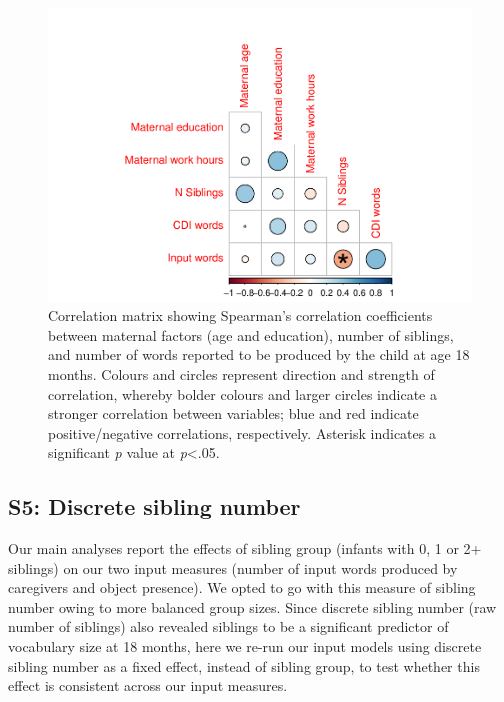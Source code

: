 \documentclass[
  man,mask,floatsintext]{apa6}
\begin{document}
\begin{figure}
\centering
\includegraphics{SiblingsStudy_SupplementaryData-anon-revisions_files/figure-latex/Figure-correlations-1.pdf}
\caption{\label{fig:Figure-correlations}Correlation matrix showing Spearman's correlation coefficients between maternal factors (age and education), number of siblings, and number of words reported to be produced by the child at age 18 months. Colours and circles represent direction and strength of correlation, whereby bolder colours and larger circles indicate a stronger correlation between variables; blue and red indicate positive/negative correlations, respectively. Asterisk indicates a significant \emph{p} value at \emph{p}\textless.05.}
\end{figure}

\newpage

\hypertarget{s5-discrete-sibling-number}{%
\subsection{S5: Discrete sibling number}\label{s5-discrete-sibling-number}}

Our main analyses report the effects of sibling group (infants with 0, 1 or 2+ siblings) on our two input measures (number of input words produced by caregivers and object presence). We opted to go with this measure of sibling number owing to more balanced group sizes. Since discrete sibling number (raw number of siblings) also revealed siblings to be a significant predictor of vocabulary size at 18 months, here we re-run our input models using discrete sibling number as a fixed effect, instead of sibling group, to test whether this effect is consistent across our input measures.
\end{document}
